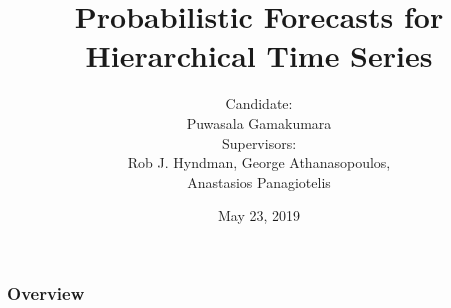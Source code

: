 \documentclass[11pt,xcolor=dvipsnames,handout]{beamer} %
\title[Probabilistic Hierarchical Forecasting]{Probabilistic Forecasts for Hierarchical Time Series}
\author[Puwasala Gamakumara]{Candidate:\\Puwasala Gamakumara\\ \medskip \medskip Supervisors:\\  Rob J. Hyndman, George Athanasopoulos,\\Anastasios Panagiotelis }
\institute[]{Department of Econometrics and Business Statistics\\ \medskip Monash University}
\date{May 23, 2019}
\begin{document}
\begin{frame}
\titlepage
\end{frame}

\begin{frame}
\frametitle{Overview} %
\tableofcontents %
\end{frame}


%




%
\end{document}
